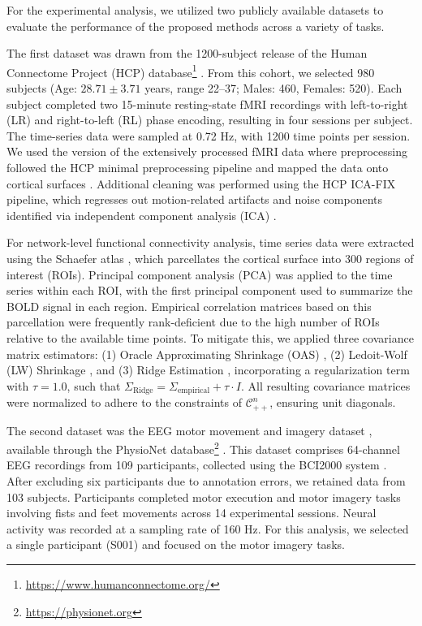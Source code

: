 \documentclass[10pt]{article}
\newcommand{\CORR}{\mathcal{C}_{++}^n}
\begin{document}
For the experimental analysis, we utilized two publicly available datasets to evaluate the performance of the proposed methods across a variety of tasks. 

The first dataset was drawn from the 1200-subject release of the Human Connectome Project (HCP) database\footnote{\url{https://www.humanconnectome.org/}} \citep{vanessen_2012_HumanConnectomeProject}. From this cohort, we selected 980 subjects (Age: $28.71 \pm 3.71$ years, range 22–37; Males: 460, Females: 520). Each subject completed two 15-minute resting-state fMRI recordings with left-to-right (LR) and right-to-left (RL) phase encoding, resulting in four sessions per subject. The time-series data were sampled at 0.72 Hz, with 1200 time points per session. We used the version of the extensively processed fMRI data where preprocessing followed the HCP minimal preprocessing pipeline and mapped the data onto cortical surfaces \citep{glasser_2013_MinimalPreprocessingPipelines}. Additional cleaning was performed using the HCP ICA-FIX pipeline, which regresses out motion-related artifacts and noise components identified via independent component analysis (ICA) \citep{salimi-khorshidi_2014_AutomaticDenoisingFunctional, griffanti_2014_ICAbasedArtefactRemoval}.

For network-level functional connectivity analysis, time series data were extracted using the Schaefer atlas \citep{schaefer_2018_LocalGlobalParcellationHuman}, which parcellates the cortical surface into 300 regions of interest (ROIs). Principal component analysis (PCA) was applied to the time series within each ROI, with the first principal component used to summarize the BOLD signal in each region. Empirical correlation matrices based on this parcellation were frequently rank-deficient due to the high number of ROIs relative to the available time points. To mitigate this, we applied three covariance matrix estimators: (1) Oracle Approximating Shrinkage (OAS) \citep{chen_2010_ShrinkageAlgorithmsMMSE}, (2) Ledoit-Wolf (LW) Shrinkage \citep{ledoit_2004_WellconditionedEstimatorLargedimensional}, and (3) Ridge Estimation \citep{mejia_2018_ImprovedEstimationSubjectlevel}, incorporating a regularization term with $\tau = 1.0$, such that $\Sigma_{\textrm{Ridge}} = \Sigma_\textrm{empirical} + \tau \cdot I$. All resulting covariance matrices were normalized to adhere to the constraints of $\CORR$, ensuring unit diagonals.

The second dataset was the EEG motor movement and imagery dataset \citep{schalk_2009_EEGMotorMovement}, available through the PhysioNet database\footnote{\url{https://physionet.org}} \citep{goldberger_2000_PhysioBankPhysioToolkitPhysioNet}. This dataset comprises 64-channel EEG recordings from 109 participants, collected using the BCI2000 system \citep{schalk_2004_BCI2000GeneralPurposeBrainComputer}. After excluding six participants due to annotation errors, we retained data from 103 subjects. Participants completed motor execution and motor imagery tasks involving fists and feet movements across 14 experimental sessions. Neural activity was recorded at a sampling rate of 160 Hz. For this analysis, we selected a single participant (S001) and focused on the motor imagery tasks.
\end{document}
